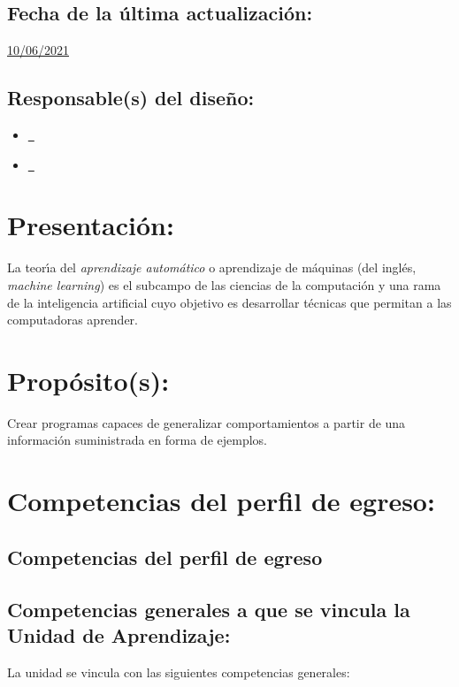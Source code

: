 \documentclass[10 pt]{article}
\begin{document}
\subsection{Fecha de la \'{u}ltima actualizaci\'{o}n:} \underline{10/06/2021}
\subsection{Responsable(s) del dise\~{n}o:}
\begin{itemize}[label={}]
\item \underline{\narturo~\arturo}
\item \underline{\nelisa~\elisa}
\end{itemize}
\newpage
\section{Presentaci\'{o}n:}

La teor\'{\i}a del {\em aprendizaje autom\'{a}tico} o aprendizaje de
m\'{a}quinas (del ingl\'{e}s, {\em machine learning}) es el subcampo
de las ciencias de la computaci\'{o}n y una rama de la inteligencia
artificial cuyo objetivo es desarrollar t\'{e}cnicas que permitan a
las computadoras aprender.

\section{Prop\'{o}sito(s):}

Crear programas capaces de generalizar comportamientos a partir de una
informaci\'{o}n suministrada en forma de ejemplos.

\section{Competencias del perfil de egreso:}
\subsection{Competencias del perfil de egreso}







\subsection{Competencias generales a que se vincula la Unidad de
  Aprendizaje:}

La unidad se vincula con las siguientes competencias generales:
\end{document}
